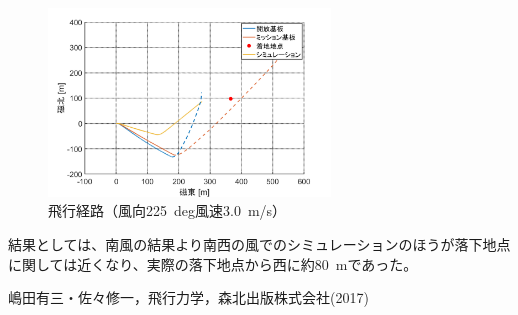 \documentclass[a4paper,11pt,titlepage,uplatex]{jsarticle}
\begin{document}
\begin{figure}[H]
    \begin{minipage}{.48\textwidth}
        \centering
        \includegraphics[width=75mm]{pic_sim/pos3_en_225.png}
        \hspace{16mm}{\small［3］磁東－磁北}
    \end{minipage}
    \caption{飛行経路（風向\SI{225}{deg}風速\SI{3.0}{m/s}）}
    \label{fig:hikoukeirosimu225}
\end{figure}

結果としては、南風の結果より南西の風でのシミュレーションのほうが落下地点に関しては近くなり、実際の落下地点から西に約\SI{80}{m}であった。


\begin{thebibliography}{99}
     嶋田有三・佐々修一，飛行力学，森北出版株式会社(2017)

\end{thebibliography}
\end{document}
